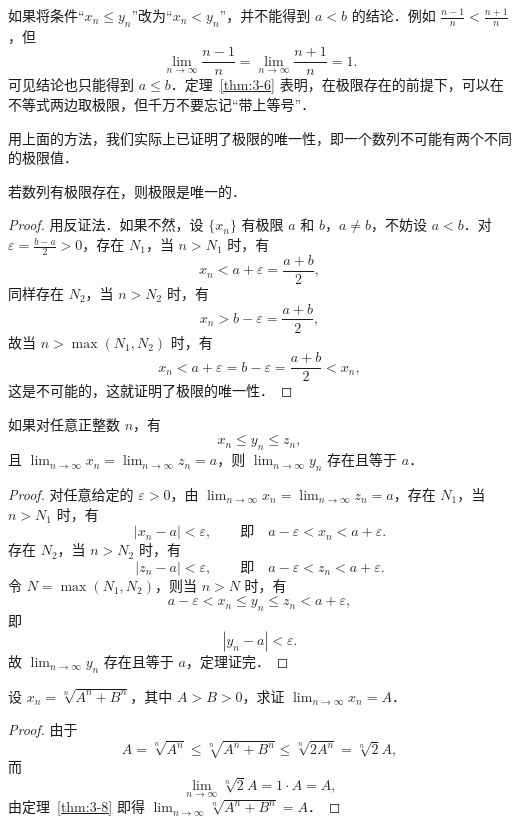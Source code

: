 如果将条件``$x_n \leqslant y_n$''改为``$x_n < y_n$''，并不能得到 $a < b$ 的结论．例如 $\frac{n-1}{n} < \frac{n+1}{n}$，但
\[
\lim_{n\to\infty}\frac{n-1}{n} = \lim_{n\to\infty}\frac{n+1}{n} = 1.
\]
可见结论也只能得到 $a \leqslant b$．定理~\ref{thm:3-6} 表明，在极限存在的前提下，可以在不等式两边取极限，但千万不要忘记``带上等号''．

用上面的方法，我们实际上已证明了极限的唯一性，即一个数列不可能有两个不同的极限值．

\begin{theorem}[唯一性]\label{thm:3-7}
若数列有极限存在，则极限是唯一的．
\end{theorem}

\begin{proof}
用反证法．如果不然，设 $\{x_n\}$ 有极限 $a$ 和 $b$，$a \neq b$，不妨设 $a < b$．对 $\varepsilon = \frac{b - a}{2} > 0$，存在 $N_1$，当 $n > N_1$ 时，有
\[
x_n < a + \varepsilon = \frac{a+b}{2},
\]
同样存在 $N_2$，当 $n > N_2$ 时，有
\[
x_n > b - \varepsilon = \frac{a+b}{2},
\]
故当 $n > \max (N_1, N_2)$ 时，有
\[
x_n < a + \varepsilon = b - \varepsilon = \frac{a+b}{2} < x_n,
\]
这是不可能的，这就证明了极限的唯一性．
\end{proof}

\begin{theorem}[夹迫性]\label{thm:3-8}
如果对任意正整数 $n$，有
\[
x_n \leqslant y_n \leqslant z_n,
\]
且 $\lim_{n\to\infty}x_n = \lim_{n\to\infty}z_n = a$，则 $\lim_{n\to\infty}y_n$ 存在且等于 $a$．
\end{theorem}

\begin{proof}
对任意给定的 $\varepsilon > 0$，由 $\lim_{n \to \infty} x_n = \lim_{n \to \infty} z_n = a$，存在 $N_1$，当 $n > N_1$ 时，有
\[
|x_n - a| < \varepsilon,\qquad \text{即}\quad a-\varepsilon < x_n < a+\varepsilon.
\]
存在 $N_2$，当 $n > N_2$ 时，有
\[
|z_n - a| < \varepsilon,\qquad \text{即}\quad a-\varepsilon < z_n < a+\varepsilon.
\]
令 $N = \max(N_1, N_2)$，则当 $n > N$ 时，有
\[
a-\varepsilon < x_n \leqslant y_n \leqslant z_n < a+\varepsilon,
\]
即
\[
|y_n - a| < \varepsilon.
\]
故 $\lim_{n\to\infty}y_n$ 存在且等于 $a$，定理证完．
\end{proof}

\begin{example}\label{ex:3-2-12}
设 $x_n = \sqrt[n]{A^n + B^n}$，其中 $A>B>0$，求证 $\lim_{n\to\infty}x_n = A$．
\end{example}

\begin{proof}
由于
\[
A = \sqrt[n]{A^n} \leqslant \sqrt[n]{A^n + B^n} \leqslant \sqrt[n]{2A^n} = \sqrt[n]{2}A,
\]
而
\[
\lim_{n\to\infty}\sqrt[n]{2}A = 1\cdot A = A,
\]
由定理~\ref{thm:3-8} 即得 $\lim_{n\to\infty}\sqrt[n]{A^n + B^n} = A$．
\end{proof}


